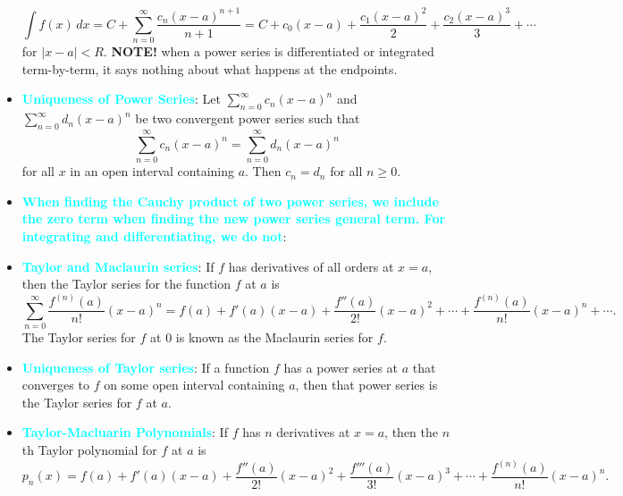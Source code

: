 \documentclass{report}
\begin{document}
\begin{itemize}
                \[
                    \int f(x) \, dx = C + \sum_{n=0}^{\infty} \frac{c_n (x - a)^{n+1}}{n+1} = C + c_0(x - a) + \frac{c_1(x - a)^2}{2} + \frac{c_2(x - a)^3}{3} + \cdots
                \]
                for $|x - a| < R$.
                \bigbreak \noindent 
                \textbf{NOTE!} when a power series is differentiated or integrated term-by-term, it says nothing about what happens at the endpoints.
            \item \textbf{\textcolor{cyan}{Uniqueness of Power Series}}:
                Let $\sum_{n=0}^{\infty} c_n (x - a)^n$ and $\sum_{n=0}^{\infty} d_n (x - a)^n$ be two convergent power series such that
                \[
                    \sum_{n=0}^{\infty} c_n (x - a)^n = \sum_{n=0}^{\infty} d_n (x - a)^n
                \]
                for all \( x \) in an open interval containing \( a \). Then \( c_n = d_n \) for all \( n \geq 0 \).
            \item \textbf{\textcolor{cyan}{When finding the Cauchy product of two power series, we include the zero term when finding the new power series general term. For integrating and differentiating, we do not}}:
            \item \textbf{\textcolor{cyan}{Taylor and Maclaurin series}}:
                If $f$ has derivatives of all orders at $x=a$, then the Taylor series for the function $f$ at $a$ is
                \begin{equation}
                    \sum_{n=0}^{\infty} \frac{f^{(n)}(a)}{n!}(x-a)^n = f(a) + f'(a)(x-a) + \frac{f''(a)}{2!}(x-a)^2 + \cdots + \frac{f^{(n)}(a)}{n!}(x-a)^n + \cdots.
                \end{equation}
                The Taylor series for $f$ at $0$ is known as the Maclaurin series for $f$.
                \bigbreak \noindent 
            \item \textbf{\textcolor{cyan}{Uniqueness of Taylor series}}:  If a function $f$ has a power series at $a$ that converges to $f$ on some open interval containing $a$, then that power series is the Taylor series for $f$ at $a$.
            \item \textbf{\textcolor{cyan}{Taylor-Macluarin Polynomials}}:         
                If $f$ has $n$ derivatives at $x=a$, then the $n$th Taylor polynomial for $f$ at $a$ is
                \begin{equation}
                    p_n(x) = f(a) + f'(a)(x-a) + \frac{f''(a)}{2!}(x-a)^2 + \frac{f'''(a)}{3!}(x-a)^3 + \cdots + \frac{f^{(n)}(a)}{n!}(x-a)^n.
                \end{equation}

\end{itemize}
\end{document}

